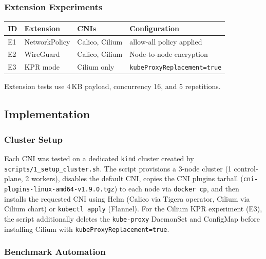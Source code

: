 \documentclass[11pt,a4paper]{article}
\begin{document}
\subsubsection{Extension Experiments}

\begin{longtable}{p{1.5cm}p{3cm}p{3cm}p{5.5cm}}
  \toprule
  \textbf{ID} & \textbf{Extension} & \textbf{CNIs} & \textbf{Configuration} \\
  \midrule
  E1 & NetworkPolicy & Calico, Cilium & allow-all policy applied \\
  E2 & WireGuard & Calico, Cilium & Node-to-node encryption \\
  E3 & KPR mode & Cilium only & \texttt{kubeProxyReplacement=true} \\
  \bottomrule
\end{longtable}

Extension tests use 4\,KB payload, concurrency 16, and 5 repetitions.

\subsection{Implementation}

\subsubsection{Cluster Setup}

Each CNI was tested on a dedicated \texttt{kind} cluster created by \texttt{scripts/1\_setup\_cluster.sh}.
The script provisions a 3-node cluster (1 control-plane, 2 workers), disables the default CNI,
copies the CNI plugins tarball (\texttt{cni-plugins-linux-amd64-v1.9.0.tgz}) to each node via \texttt{docker cp},
and then installs the requested CNI using Helm (Calico via Tigera operator, Cilium via Cilium chart) or
\texttt{kubectl apply} (Flannel).
For the Cilium KPR experiment (E3), the script additionally deletes the \texttt{kube-proxy} DaemonSet and ConfigMap
before installing Cilium with \texttt{kubeProxyReplacement=true}.

\subsubsection{Benchmark Automation}
\end{document}
